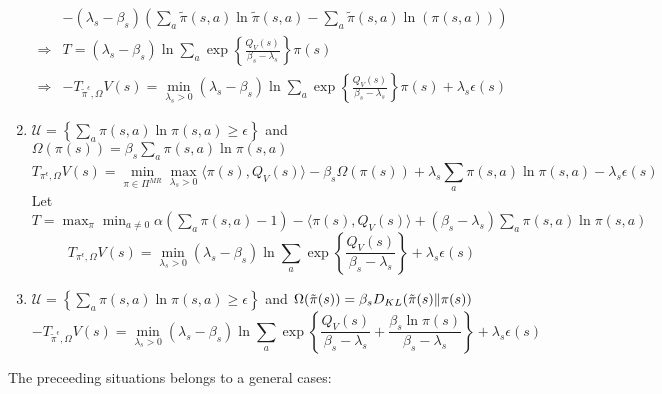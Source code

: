 \documentclass[a4paper]{article}
\begin{document}
\begin{enumerate}
\begin{align*}
    &- (\lambda_s-\beta_s) \left( \sum^{}_{a} \tilde \pi(s, a) \ln \tilde \pi(s, a) - \sum^{}_{a} \tilde \pi(s,a) \ln(\pi(s,a)) \right) \\
    \Rightarrow& T = (\lambda_s - \beta_s) \ln \sum^{}_{a} \exp \left\{ \frac{Q_V(s)}{\beta_s - \lambda_s}  \right\} \pi(s)\\
    \Rightarrow& -T_{\tilde\pi^{\epsilon}, \Omega}V(s) = \min_{\lambda_s > 0} (\lambda_s - \beta_s)\ln \sum^{}_{a} \exp \left\{ \frac{Q_V(s)}{\beta_s - \lambda_s}  \right\}\pi(s) + \lambda_s \epsilon(s)
    \end{align*}
\item $ \mathcal{U} = \left\{ \sum^{}_{a} \pi(s,a) \ln\pi(s,a) \ge \epsilon \right\} $ and $ \Omega(\pi(s)) = \beta_s \sum^{}_{a} \pi(s,a) \ln \pi(s,a) $
    \[
        T_{\pi^{\epsilon}, \Omega}V(s) = \min_{\pi \in \Pi^{MR}}\max_{\lambda_s > 0} \langle \pi(s), Q_V(s) \rangle - \beta_s \Omega(\pi(s)) + \lambda_s \sum^{}_{a} \pi(s,a) \ln \pi(s,a) - \lambda_s \epsilon(s)
    \]
    Let $ T = \max_{\pi} \min_{a \ne 0} \alpha ( \sum^{}_{a} \pi(s,a) - 1) - \langle \pi(s), Q_V(s) \rangle + (\beta_s - \lambda_s) \sum^{}_{a} \pi(s,a) \ln \pi(s,a)$
    \[
        T_{\pi^{\epsilon}, \Omega}V(s) = \min_{\lambda_s > 0} (\lambda_s - \beta_s) \ln \sum^{}_{a} \exp\left\{ \frac{Q_V(s)}{\beta_s - \lambda_s} \right\} + \lambda_s \epsilon(s)
    \]
\item $  \mathcal{U} = \left\{ \sum^{}_{a} \pi(s,a) \ln\pi(s,a) \ge \epsilon \right\} $ and $ \Omega(\tilde\pi(s)) = \beta_s D_{KL}(\tilde \pi(s) \Arrowvert \pi(s)) $
    \[
        -T_{\tilde \pi^{\epsilon}, \Omega}V(s) = \min_{\lambda_s > 0} (\lambda_s - \beta_s) \ln \sum^{}_{a} \exp\left\{ \frac{Q_V(s)}{\beta_s - \lambda_s} + \frac{\beta_s \ln \pi(s)}{\beta_s - \lambda_s}  \right\} + \lambda_s \epsilon(s)
    \]
\end{enumerate}
The preceeding situations belongs to a general cases:
\end{document}
